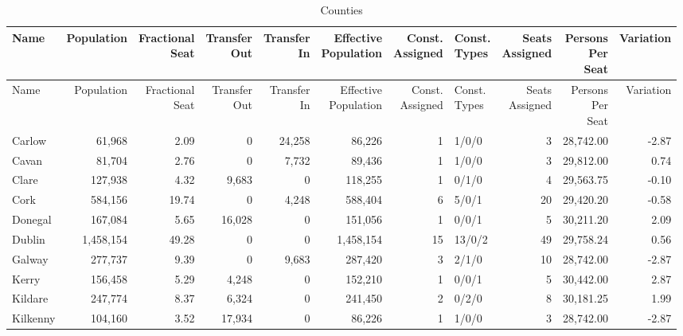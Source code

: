 \documentclass[a4paper]{article}
\begin{document}
\begin{longtable}{lrrrrrrlrrr}
\caption{Counties}
\\ \toprule
Name &Population &\shortstack{Fractional\\Seat} &\shortstack{Transfer\\Out} &\shortstack{Transfer\\In} &\shortstack{Effective\\Population} &\shortstack{Const.\\Assigned} &\shortstack{Const.\\Types} &\shortstack{Seats\\Assigned} &\shortstack{Persons\\Per\\Seat} &Variation \\ \midrule
\endfirsthead
\toprule
Name &Population &\shortstack{Fractional\\Seat} &\shortstack{Transfer\\Out} &\shortstack{Transfer\\In} &\shortstack{Effective\\Population} &\shortstack{Const.\\Assigned} &\shortstack{Const.\\Types} &\shortstack{Seats\\Assigned} &\shortstack{Persons\\Per\\Seat} &Variation \\ \midrule
\endhead
\bottomrule
\endfoot
Carlow&61,968& 2.09&0&24,258&86,226&1&1/0/0&3&28,742.00&-2.87\\ 
Cavan&81,704& 2.76&0&7,732&89,436&1&1/0/0&3&29,812.00& 0.74\\ 
Clare&127,938& 4.32&9,683&0&118,255&1&0/1/0&4&29,563.75&-0.10\\ 
Cork&584,156&19.74&0&4,248&588,404&6&5/0/1&20&29,420.20&-0.58\\ 
Donegal&167,084& 5.65&16,028&0&151,056&1&0/0/1&5&30,211.20& 2.09\\ 
Dublin&1,458,154&49.28&0&0&1,458,154&15&13/0/2&49&29,758.24& 0.56\\ 
Galway&277,737& 9.39&0&9,683&287,420&3&2/1/0&10&28,742.00&-2.87\\ 
Kerry&156,458& 5.29&4,248&0&152,210&1&0/0/1&5&30,442.00& 2.87\\ 
Kildare&247,774& 8.37&6,324&0&241,450&2&0/2/0&8&30,181.25& 1.99\\ 
Kilkenny&104,160& 3.52&17,934&0&86,226&1&1/0/0&3&28,742.00&-2.87\\ 

\end{longtable}
\end{document}

